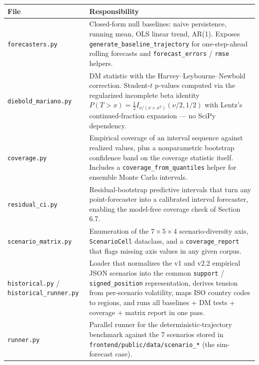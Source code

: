 \documentclass[
]{article}
\begin{document}
\begin{longtable}[]{@{}
  >{\raggedright\arraybackslash}p{}
  >{\raggedright\arraybackslash}p{}@{}}
\toprule\noalign{}
\begin{minipage}[b]{\linewidth}\raggedright
File
\end{minipage} & \begin{minipage}[b]{\linewidth}\raggedright
Responsibility
\end{minipage} \\
\midrule\noalign{}
\endhead
\bottomrule\noalign{}
\endlastfoot
\texttt{forecasters.py} & Closed-form null baselines: naive persistence,
running mean, OLS linear trend, AR(1). Exposes
\texttt{generate\_baseline\_trajectory} for one-step-ahead rolling
forecasts and \texttt{forecast\_errors} / \texttt{rmse} helpers. \\
\texttt{diebold\_mariano.py} & DM statistic with the
Harvey--Leybourne--Newbold correction. Student-\(t\) p-values computed
via the regularized incomplete beta identity
\(P(T > x) = \tfrac{1}{2} I_{\nu/(\nu+x^2)}(\nu/2, 1/2)\) with Lentz's
continued-fraction expansion --- no SciPy dependency. \\
\texttt{coverage.py} & Empirical coverage of an interval sequence
against realized values, plus a nonparametric bootstrap confidence band
on the coverage statistic itself. Includes a
\texttt{coverage\_from\_quantiles} helper for ensemble Monte Carlo
intervals. \\
\texttt{residual\_ci.py} & Residual-bootstrap predictive intervals that
turn any point-forecaster into a calibrated interval forecaster,
enabling the model-free coverage check of Section 6.7. \\
\texttt{scenario\_matrix.py} & Enumeration of the
\(7 \times 5 \times 4\) scenario-diversity axis, \texttt{ScenarioCell}
dataclass, and a \texttt{coverage\_report} that flags missing axis
values in any given corpus. \\
\texttt{historical.py} / \texttt{historical\_runner.py} & Loader that
normalizes the v1 and v2.2 empirical JSON scenarios into the common
\texttt{support} / \texttt{signed\_position} representation, derives
tension from per-scenario volatility, maps ISO country codes to regions,
and runs all baselines + DM tests + coverage + matrix report in one
pass. \\
\texttt{runner.py} & Parallel runner for the deterministic-trajectory
benchmark against the 7 scenarios stored in
\texttt{frontend/public/data/scenario\_*} (the sim-forecast case). \\
\end{longtable}
\end{document}
